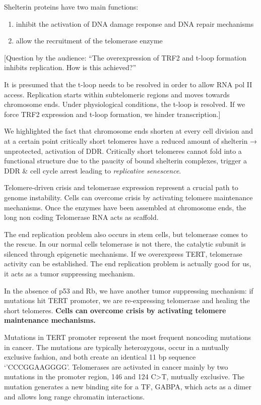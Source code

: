 Shelterin proteins have two main functions:

\begin{enumerate}
\def\labelenumi{\arabic{enumi}.}
\tightlist
\item
  inhibit the activation of DNA damage response and DNA repair
  mechanisms
\item
  allow the recruitment of the telomerase enzyme
\end{enumerate}

[Question by the audience: ``The overexpression of TRF2 and t-loop
formation inhibits replication. How is this achieved?''

It is presumed that the t-loop needs to be resolved in order to allow
RNA pol II access. Replication starts within subtelomeric regions and
moves towards chromosome ends. Under physiological conditions, the
t-loop is resolved. If we force TRF2 expression and t-loop formation, we
hinder transcription.]

We highlighted the fact that chromosome ends shorten at every cell
division and at a certain point critically short telomeres have a
reduced amount of shelterin → unprotected, activation of DDR. Critically
short telomeres cannot fold into a functional structure due to the
paucity of bound shelterin complexes, trigger a DDR \& cell cycle arrest
leading to \emph{replicative senescence}.

Telomere-driven crisis and telomerase expression represent a crucial
path to genome instability. Cells can overcome crisis by activating
telomere maintenance mechanisms. Once the enzymes have been assembled at
chromosome ends, the long non coding Telomerase RNA acts as scaffold.

The end replication problem also occurs in stem cells, but telomerase
comes to the rescue. In our normal cells telomerase is not there, the
catalytic subunit is silenced through epigenetic mechanisms. If we
overexpress TERT, telomerase activity can be established. The end
replication problem is actually good for us, it acts as a tumor
suppressing mechanism.

In the absence of p53 and Rb, we have another tumor suppressing
mechanism: if mutations hit TERT promoter, we are re-expressing
telomerase and healing the short telomeres. \textbf{Cells can overcome
crisis by activating telomere maintenance mechanisms.}

Mutations in TERT promoter represent the most frequent noncoding
mutations in cancer. The mutations are typically heterozygous, occur in
a mutually exclusive fashion, and both create an identical 11 bp
sequence `'CCCGGAAGGGG'. Telomerases are activated in cancer mainly by
two mutations in the promoter region, 146 and 124 C\textgreater T,
mutually exclusive. The mutation generates a new binding site for a TF,
GABPA, which acts as a dimer and allows long range chromatin
interactions.

